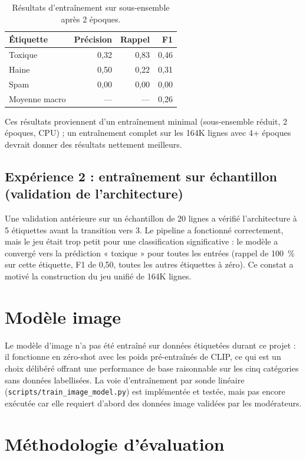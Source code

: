 \begin{table}[H]
\centering
\caption{Résultats d'entraînement sur sous-ensemble après 2 époques.}
\label{tab:subset_results}
\begin{tabular}{lrrr}
\toprule
\textbf{Étiquette} & \textbf{Précision} & \textbf{Rappel} & \textbf{F1} \\
\midrule
Toxique & 0,32 & 0,83 & 0,46 \\
Haine & 0,50 & 0,22 & 0,31 \\
Spam & 0,00 & 0,00 & 0,00 \\
\midrule
Moyenne macro & --- & --- & 0,26 \\
\bottomrule
\end{tabular}
\end{table}

Ces résultats proviennent d'un entraînement minimal (sous-ensemble réduit, 2 époques, CPU) ; un entraînement complet sur les 164K lignes avec 4+ époques devrait donner des résultats nettement meilleurs.

\subsection{Expérience 2 : entraînement sur échantillon (validation de l'architecture)}

Une validation antérieure sur un échantillon de 20 lignes a vérifié l'architecture à 5 étiquettes avant la transition vers 3. Le pipeline a fonctionné correctement, mais le jeu était trop petit pour une classification significative : le modèle a convergé vers la prédiction « toxique » pour toutes les entrées (rappel de 100~\% sur cette étiquette, F1 de 0,50, toutes les autres étiquettes à zéro). Ce constat a motivé la construction du jeu unifié de 164K lignes.

\section{Modèle image}

Le modèle d'image n'a pas été entraîné sur données étiquetées durant ce projet : il fonctionne en zéro-shot avec les poids pré-entraînés de CLIP, ce qui est un choix délibéré offrant une performance de base raisonnable sur les cinq catégories sans données labellisées. La voie d'entraînement par sonde linéaire (\texttt{scripts/train\_image\_model.py}) est implémentée et testée, mais pas encore exécutée car elle requiert d'abord des données image validées par les modérateurs.

\section{Méthodologie d'évaluation}

